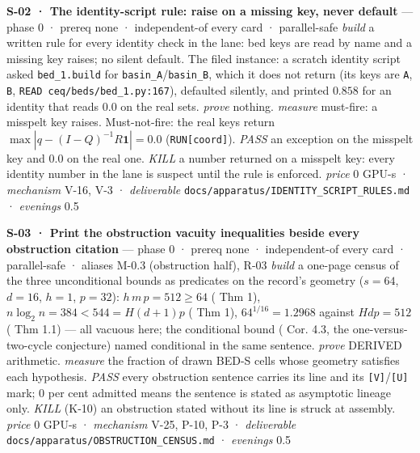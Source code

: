 \documentclass[11pt,a4paper]{article}
\newcounter{none}                 %
\theoremstyle{plain}
\theoremstyle{definition}
\theoremstyle{remark}
\begin{document}
\textbf{S-02 · The identity-script rule: raise on a missing key, never
default} --- phase 0 · prereq none · independent-of every card ·
parallel-safe \emph{build} a written rule for every identity check in
the lane: bed keys are read by name and a missing key raises; no silent
default. The filed instance: a scratch identity script asked
\texttt{bed\_1.build} for \texttt{basin\_A}/\texttt{basin\_B}, which it
does not return (its keys are \texttt{A}, \texttt{B},
\texttt{READ\ ceq/beds/bed\_1.py:167}), defaulted silently, and printed
\(0.858\) for an identity that reads \(0.0\) on the real sets.
\emph{prove} nothing. \emph{measure} must-fire: a misspelt key raises.
Must-not-fire: the real keys return \(\max|q-(I-Q)^{-1}R\mathbf 1|=0.0\)
(\texttt{RUN{[}coord{]}}). \emph{PASS} an exception on the misspelt key
and \(0.0\) on the real one. \emph{KILL} a number returned on a misspelt
key: every identity number in the lane is suspect until the rule is
enforced. \emph{price} \(0\) GPU-s · \emph{mechanism} V-16, V-3 ·
\emph{deliverable} \texttt{docs/apparatus/IDENTITY\_SCRIPT\_RULES.md} ·
\emph{evenings} 0.5

\textbf{S-03 · Print the obstruction vacuity inequalities beside every
obstruction citation} --- phase 0 · prereq none · independent-of every
card · parallel-safe · aliases M-0.3 (obstruction half), R-03
\emph{build} a one-page census of the three unconditional bounds as
predicates on the record's geometry (\(s=64\), \(d=16\), \(h=1\),
\(p=32\)): \(h\,m\,p=512\ge64\) (\citep{sanford-2024-inductionheads} Thm
1), \(n\log_2 n=384<544=H(d+1)p\)
(\citep{peng-2024-transformer-limitations} Thm 1), \(64^{1/16}=1.2968\)
against \(Hdp=512\) (\citep{chen-2024-multilayer} Thm 1.1) --- all
vacuous here; the conditional bound (\citep{sanford-2024-logdepth} Cor.
4.3, the one-versus-two-cycle conjecture) named conditional in the same
sentence. \emph{prove} DERIVED arithmetic. \emph{measure} the fraction
of drawn BED-S cells whose geometry satisfies each hypothesis.
\emph{PASS} every obstruction sentence carries its line and its
\texttt{{[}V{]}}/\texttt{{[}U{]}} mark; \(0\) per cent admitted means
the sentence is stated as asymptotic lineage only. \emph{KILL} (K-10) an
obstruction stated without its line is struck at assembly. \emph{price}
\(0\) GPU-s · \emph{mechanism} V-25, P-10, P-3 · \emph{deliverable}
\texttt{docs/apparatus/OBSTRUCTION\_CENSUS.md} · \emph{evenings} 0.5
\end{document}
